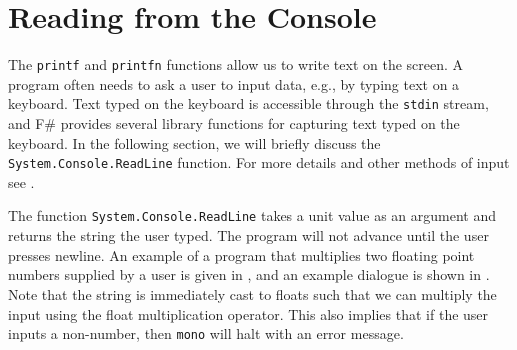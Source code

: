 \documentclass[fsharpnotes.tex]{subfiles}
\begin{document}
\section{Reading from the Console}
\label{sec:readline}
The \lstinline{printf} and \lstinline{printfn} functions allow us to write text on the screen. A program often needs to ask a user to input data, e.g., by typing text on a keyboard. Text typed on the keyboard is accessible through the \lstinline{stdin} stream, and F\# provides several library functions for capturing text typed on the keyboard. In the following section, we will briefly discuss the \lstinline{System.Console.ReadLine} function. For more details and other methods of input see .

The function \lstinline{System.Console.ReadLine} takes a unit value as an argument and returns the string the user typed. The program will not advance until the user presses newline. An example of a program that multiplies two floating point numbers supplied by a user is given in ,
%
%
and an example dialogue is shown in .
%
%
%
%
%
Note that the string is immediately cast to floats such that we can multiply the input using the float multiplication operator. This also implies that if the user inputs a non-number, then \lstinline[language=console]{mono} will halt with an error message.
\end{document}
